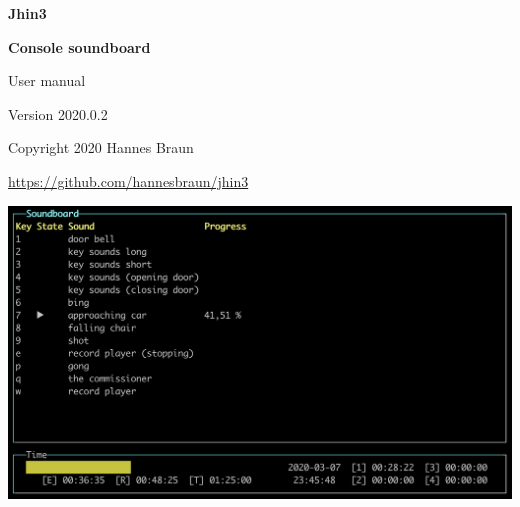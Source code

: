 \documentclass[12pt,a4paper]{article}
\begin{document}

\pagestyle{fancy}
\cfoot{}

\thispagestyle{empty}
\begin{center}
\begin{Huge}
\textbf{Jhin3}
\end{Huge}

\begin{Large}
\vspace{0.4cm}
\textbf{Console soundboard}
\end{Large}

\begin{large}
\vspace{0.1cm}
User manual

\vspace{1cm}

Version 2020.0.2

\vspace{0.7cm}

Copyright \textcopyright{} 2020 Hannes Braun

\href{https://github.com/hannesbraun/jhin3}{https://github.com/hannesbraun/jhin3}
\end{large}

\vspace{2.4cm}
\includegraphics[scale=0.6]{../preview.png}

\end{center}
\newpage

\tableofcontents
\newpage





\end{document}
